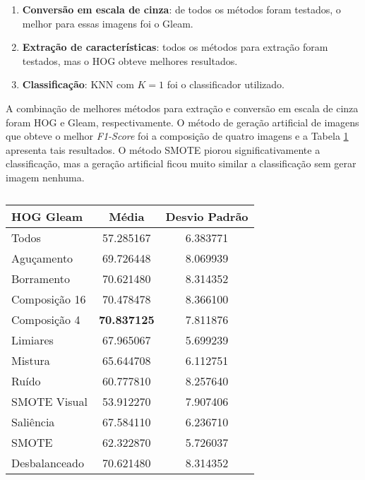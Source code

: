 \begin{enumerate}
\item \textbf{Conversão em escala de cinza}: de todos os métodos foram testados, o melhor para essas imagens foi o Gleam.
\item \textbf{Extração de características}: todos os métodos para extração foram testados, mas o HOG obteve melhores resultados.
\item \textbf{Classificação}: KNN com $K=1$ foi o classificador utilizado.
\end{enumerate}


A combinação de melhores métodos para extração e conversão em escala de cinza foram HOG e Gleam, respectivamente. O método de geração artificial de imagens que obteve o melhor \textit{F1-Score} foi a composição de quatro imagens e a Tabela \ref{tab:resultados:4.2} apresenta tais resultados. O método SMOTE piorou significativamente a classificação, mas a geração artificial ficou muito similar a classificação sem gerar imagem nenhuma.

\begin{table}[H]
\begin{center}
\caption{}
\label{tab:resultados:4.2}
\begin{tabular}{|l|c|c|}
\hline
\textbf{HOG Gleam} & \textbf{Média}     & \textbf{Desvio Padrão} \\ \hline
   Todos        &  57.285167 &  6.383771  \\ \hline
  Aguçamento    &  69.726448 &  8.069939  \\ \hline
  Borramento    &  70.621480 &  8.314352  \\ \hline
  Composição 16 &  70.478478 &  8.366100  \\ \hline
  Composição 4  &  \textbf{70.837125} &  7.811876  \\ \hline
  Limiares      &  67.965067 &  5.699239  \\ \hline
  Mistura       &  65.644708 &  6.112751  \\ \hline
  Ruído         &  60.777810 &  8.257640  \\ \hline
  SMOTE Visual  &  53.912270 &  7.907406  \\ \hline
  Saliência     &  67.584110 &  6.236710  \\ \hline
 SMOTE          &  62.322870 &  5.726037  \\ \hline
Desbalanceado   &  70.621480 &  8.314352  \\ \hline
\end{tabular}
\end{center}
\end{table}

